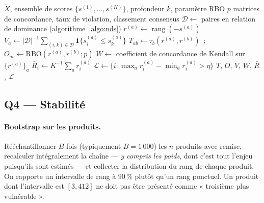 \documentclass[11pt,a4paper]{article}
\theoremstyle{definition}
\theoremstyle{remark}
\newcommand{\abs}[1]{\left\lvert #1 \right\rvert}
\newcommand{\ind}[1]{\mathbf{1}\{#1\}}
\begin{document}
\begin{algorithm}[htbp]
  \caption{Tableau de bord de cohérence}
  \label{algo:coherence}
  \begin{algorithmic}[1]
    \Require $\tilde{X}$, ensemble de scores $\{s^{(1)},\dots,s^{(K)}\}$, profondeur $k$, paramètre RBO $p$
    \Ensure matrices de concordance, taux de violation, classement consensus
    \State $\mathcal{D} \gets$ paires en relation de dominance (algorithme~\ref{algo:nds})
      \State $r^{(a)} \gets \operatorname{rang}(-s^{(a)})$ 
      \State $V_a \gets \abs{\mathcal{D}}^{-1}\sum_{(i,k)\in\mathcal{D}} \ind{s^{(a)}_i \le s^{(a)}_k}$
        \State $T_{ab} \gets \tau_b(r^{(a)}, r^{(b)})$~;\quad
              $O_{ab} \gets \mathrm{RBO}(r^{(a)}, r^{(b)}; p)$
      \EndFor
    \EndFor
    \State $W \gets$ coefficient de concordance de Kendall sur $\{r^{(a)}\}_a$
    \State $\bar{R}_i \gets K^{-1}\sum_a r^{(a)}_i$ 
    \State $\mathcal{L} \gets \{ i : \max_a r^{(a)}_i - \min_a r^{(a)}_i > \eta \}$
    \State \Return $T$, $O$, $V$, $W$, $\bar{R}$, $\mathcal{L}$
  \end{algorithmic}
\end{algorithm}

\subsection{Q4 --- Stabilité}
\label{sec:bootstrap}

\medskip

\paragraph{Bootstrap sur les produits.} Rééchantillonner $B$ fois (typiquement $B = 1\,000$) les
$n$ produits avec remise, recalculer intégralement la chaîne --- \emph{y compris les poids}, dont
c'est tout l'enjeu puisqu'ils sont estimés --- et collecter la distribution du rang de chaque
produit. On rapporte un intervalle de rang à $90\,\%$ plutôt qu'un rang ponctuel. Un produit dont
l'intervalle est $[3, 412]$ ne doit pas être présenté comme « troisième plus vulnérable ».

\medskip
\end{document}
